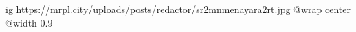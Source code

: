  
 
 
 
 

\ifcmt
  ig https://mrpl.city/uploads/posts/redactor/sr2mnmenayara2rt.jpg
  @wrap center
  @width 0.9
\fi
